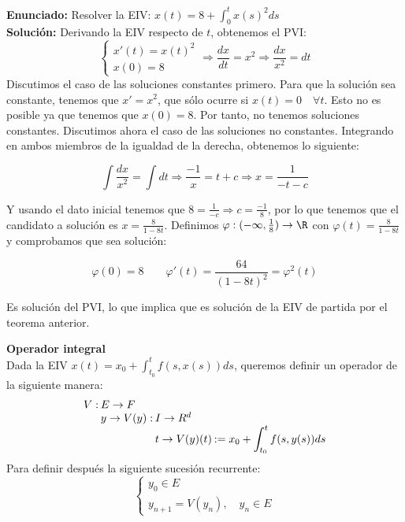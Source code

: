 \documentclass{article}
\begin{document}
\begin{ex}
  \textbf{Enunciado:} Resolver la EIV: $x(t) = 8 + \displaystyle\int_0^t x(s)^2 ds$\\

  \textbf{Solución:} Derivando la EIV respecto de $t$, obtenemos el PVI:
  \[
    \left\{
      \begin{array}{l}
        x'(t) = x(t)^2 \\
        x(0) = 8
      \end{array}
    \right. \Rightarrow \frac{dx}{dt} = x^2 \Rightarrow \frac{dx}{x^2} = dt
  \]
  Discutimos el caso de las soluciones constantes primero. Para que la solución sea constante,
  tenemos que $x' = x^2$, que sólo ocurre si $x(t) = 0 \quad \forall t$.  Esto no es posible ya que
  tenemos que $x(0) = 8$. Por tanto, no tenemos soluciones constantes. Discutimos ahora el caso de
  las soluciones no constantes. Integrando en ambos miembros de la igualdad de la derecha, obtenemos
  lo siguiente:

    $$ \int \frac{dx}{x^2} = \int dt \Rightarrow \frac{-1}{x} = t + c \Rightarrow
    x = \frac{1}{-t-c} $$

    Y usando el dato inicial tenemos que $ 8 = \frac{1}{-c} \Rightarrow c = \frac{-1}{8}$, por lo
    que tenemos que el candidato a solución es $x = \frac{8}{1-8t}$. Definimos
    $\varphi: (-\infty, \frac{1}{8}) \to \R$ con $\varphi(t) = \frac{8}{1-8t}$ y comprobamos que sea
    solución:

    $$ \varphi(0) = 8 \quad \quad \varphi'(t) = \frac{64}{(1-8t)^2} = \varphi^2(t) $$

    Es solución del PVI, lo que implica que es solución de la EIV de partida por el teorema
    anterior.
  \end{ex}

  \textbf{Operador integral}\\

  Dada la EIV $ x(t) = x_0 + \displaystyle\int_{t_0}^t f(s, x(s)) ds $, queremos definir un operador
  de la siguiente manera:
  \[\arraycolsep=1pt\def\arraystretch{1}
    \begin{array}{llll}
      V: & E \to F     &           & \\
         & y \to V(y): & I \to R^d & \\
         &             & t \to V(y)(t) & := x_0 + \displaystyle\int_{t_0}^t f(s,y(s))ds
    \end{array}
  \]
  Para definir después la siguiente sucesión recurrente:
  \[
    \left\{
      \begin{array}{l}
        y_0 \in E \\
        y_{n+1} = V(y_n), \quad y_n \in E
      \end{array}
    \right.
  \]
\end{document}
